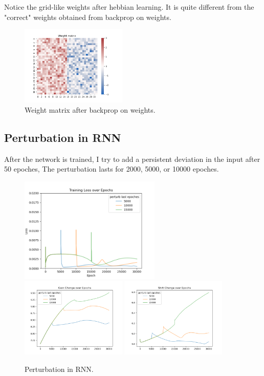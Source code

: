 \documentclass[12pt, a4paper]{article}
\begin{document}
Notice the grid-like weights after hebbian learning. It is quite different from the "correct" weights obtained from backprop on weights.

\begin{figure}[H]
    \centering
    \includegraphics[width=0.45\textwidth]{analysis/fig/0122_SIN2_wt_weight_matrix.png}
    \caption{Weight matrix after backprop on weights.}
\end{figure}

\subsection*{Perturbation in RNN}

After the network is trained, I try to add a persistent deviation in the input after 50 epoches, The perturbation lasts for 2000, 5000, or 10000 epoches.

\begin{figure}[H]
    \centering
    \includegraphics[width=0.6\textwidth]{analysis/fig/0122_SIN2_perturb_loss.png} \\
    \includegraphics[width=0.45\textwidth]{analysis/fig/0122_SIN2_perturb_gc.png} 
    \includegraphics[width=0.45\textwidth]{analysis/fig/0122_SIN2_perturb_sc.png}
    \caption{Perturbation in RNN.}
\end{figure}
\end{document}
